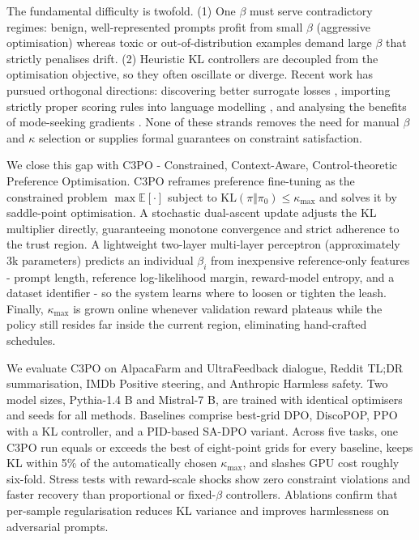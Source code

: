 \documentclass{article}
\begin{document}
The fundamental difficulty is twofold. (1) One \(\beta\) must serve contradictory regimes: benign, well-represented prompts profit from small \(\beta\) (aggressive optimisation) whereas toxic or out-of-distribution examples demand large \(\beta\) that strictly penalises drift. (2) Heuristic KL controllers are decoupled from the optimisation objective, so they often oscillate or diverge. Recent work has pursued orthogonal directions: discovering better surrogate losses \cite{lu-2024-discovering}, importing strictly proper scoring rules into language modelling \cite{shao-2024-language}, and analysing the benefits of mode-seeking gradients \cite{tajwar-2024-preference}. None of these strands removes the need for manual \(\beta\) and \(\kappa\) selection or supplies formal guarantees on constraint satisfaction.

We close this gap with C3PO - Constrained, Context-Aware, Control-theoretic Preference Optimisation. C3PO reframes preference fine-tuning as the constrained problem \(\max \mathbb{E}[\cdot]\) subject to \(\mathrm{KL}(\pi\Vert\pi_{0}) \le \kappa_{\max}\) and solves it by saddle-point optimisation. A stochastic dual-ascent update adjusts the KL multiplier directly, guaranteeing monotone convergence and strict adherence to the trust region. A lightweight two-layer multi-layer perceptron (approximately 3k parameters) predicts an individual \(\beta_i\) from inexpensive reference-only features - prompt length, reference log-likelihood margin, reward-model entropy, and a dataset identifier - so the system learns where to loosen or tighten the leash. Finally, \(\kappa_{\max}\) is grown online whenever validation reward plateaus while the policy still resides far inside the current region, eliminating hand-crafted schedules.

We evaluate C3PO on AlpacaFarm and UltraFeedback dialogue, Reddit TL;DR summarisation, IMDb Positive steering, and Anthropic Harmless safety. Two model sizes, Pythia-1.4 B and Mistral-7 B, are trained with identical optimisers and seeds for all methods. Baselines comprise best-grid DPO, DiscoPOP, PPO with a KL controller, and a PID-based SA-DPO variant. Across five tasks, one C3PO run equals or exceeds the best of eight-point grids for every baseline, keeps KL within 5\% of the automatically chosen \(\kappa_{\max}\), and slashes GPU cost roughly six-fold. Stress tests with reward-scale shocks show zero constraint violations and faster recovery than proportional or fixed-\(\beta\) controllers. Ablations confirm that per-sample regularisation reduces KL variance and improves harmlessness on adversarial prompts.
\end{document}
